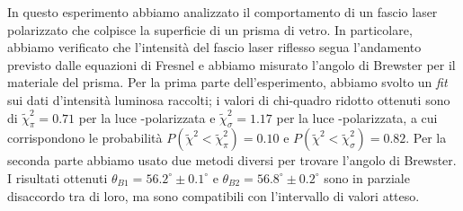 In questo esperimento abbiamo analizzato il comportamento di un fascio laser polarizzato
che colpisce la superficie di un prisma di vetro.
In particolare, abbiamo verificato che l’intensità del fascio laser riflesso segua l’andamento
previsto dalle equazioni di Fresnel e abbiamo misurato l'angolo di Brewster per il materiale del prisma.
Per la prima parte dell'esperimento, abbiamo svolto un \emph{fit} sui dati d'intensità luminosa raccolti; i valori di chi-quadro ridotto
ottenuti sono di $\tilde \chi^2_\pi = 0.71$ per la luce \pi-polarizzata e
$\tilde \chi^2_\sigma = 1.17$ per la luce \sigma-polarizzata, a cui corrispondono le probabilità $P(\tilde \chi^2 < \tilde \chi^2_\pi) = 0.10$ e $P(\tilde \chi^2 < \tilde \chi^2_\sigma) = 0.82$.
Per la seconda parte abbiamo usato due metodi diversi per trovare l'angolo di Brewster.
I risultati ottenuti $\theta_{B1} = 56.2^\circ \pm 0.1^\circ$ e $\theta_{B2} = 56.8^\circ \pm 0.2^\circ$ sono in parziale disaccordo tra di loro,
ma sono compatibili con l'intervallo di valori atteso.
\endinput
